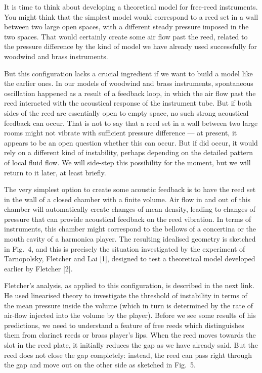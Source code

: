   It is time to think about developing a theoretical model for free-reed 
  instruments. You might think that the simplest model would correspond to a 
  reed set in a wall between two large open spaces, with a different steady 
  pressure imposed in the two spaces. That would certainly create some air flow 
  past the reed, related to the pressure difference by the kind of model we 
  have already used successfully for woodwind and brass instruments. 

  But this configuration lacks a crucial ingredient if we want to build a model 
  like the earlier ones. In our models of woodwind and brass instruments, 
  spontaneous oscillation happened as a result of a feedback loop, in which the 
  air flow past the reed interacted with the acoustical response of the 
  instrument tube. But if both sides of the reed are essentially open to empty 
  space, no such strong acoustical feedback can occur. That is not to say that 
  a reed set in a wall between two large rooms might not vibrate with 
  sufficient pressure difference — at present, it appears to be an open 
  question whether this can occur. But if did occur, it would rely on a 
  different kind of instability, perhaps depending on the detailed pattern of 
  local fluid flow. We will side-step this possibility for the moment, but we 
  will return to it later, at least briefly. 

  The very simplest option to create some acoustic feedback is to have the reed 
  set in the wall of a closed chamber with a finite volume. Air flow in and out 
  of this chamber will automatically create changes of mean density, leading to 
  changes of pressure that can provide acoustical feedback on the reed 
  vibration. In terms of instruments, this chamber might correspond to the 
  bellows of a concertina or the mouth cavity of a harmonica player. The 
  resulting idealised geometry is sketched in Fig.\ 4, and this is precisely 
  the situation investigated by the experiment of Tarnopolsky, Fletcher and Lai 
  [1], designed to test a theoretical model developed earlier by Fletcher [2]. 

  Fletcher’s analysis, as applied to this configuration, is described in the 
  next link. He used linearised theory to investigate the threshold of 
  instability in terms of the mean pressure inside the volume (which in turn is 
  determined by the rate of air-flow injected into the volume by the player). 
  Before we see some results of his predictions, we need to understand a 
  feature of free reeds which distinguishes them from clarinet reeds or brass 
  player’s lips. When the reed moves towards the slot in the reed plate, it 
  initially reduces the gap as we have already said. But the reed does not 
  close the gap completely: instead, the reed can pass right through the gap 
  and move out on the other side as sketched in Fig.\ 5. 


